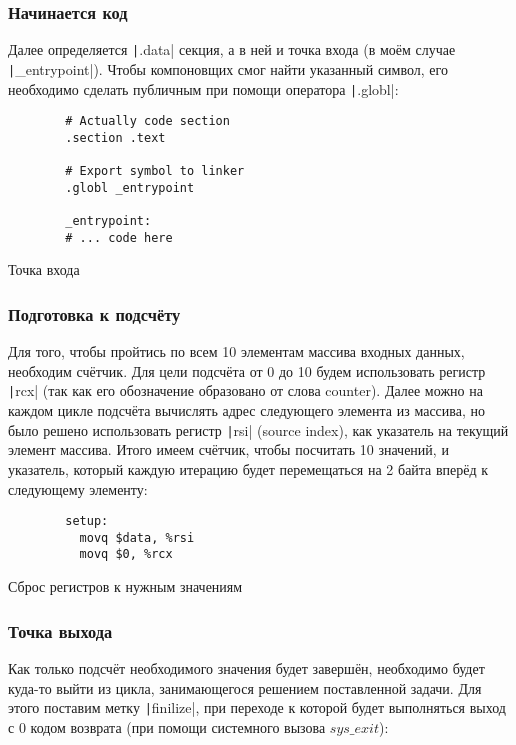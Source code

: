 \documentclass[a4paper]{article}
\begin{document}
  \subsubsection{Начинается код}

  Далее определяется \texttt|.data| секция, а в ней
  и точка входа (в моём случае \texttt|_entrypoint|).
  Чтобы компоновщих смог найти указанный символ, его необходимо
  сделать публичным при помощи оператора \texttt|.globl|:

  \begin{listing}[H]
    \begin{verbatim}
        # Actually code section
        .section .text

        # Export symbol to linker
        .globl _entrypoint

        _entrypoint:
        # ... code here
    \end{verbatim}
    \caption{Точка входа}
  \end{listing}

  \subsubsection{Подготовка к подсчёту}

  Для того, чтобы пройтись по всем 10 элементам массива входных данных,
  необходим счётчик. Для цели подсчёта от 0 до 10 будем использовать
  регистр \texttt|rcx| (так как его обозначение образовано
  от слова counter). Далее можно на каждом цикле подсчёта
  вычислять адрес следующего элемента из массива, но было решено 
  использовать регистр \texttt|rsi| (source index),
  как указатель на текущий элемент массива. Итого имеем счётчик,
  чтобы посчитать 10 значений, и указатель, который каждую итерацию будет
  перемещаться на 2 байта вперёд к следующему элементу:

  \begin{listing}[H]
    \begin{verbatim}
        setup:
          movq $data, %rsi  
          movq $0, %rcx
    \end{verbatim}
    \caption{Сброс регистров к нужным значениям}
  \end{listing}

  \subsubsection{Точка выхода}

  Как только подсчёт необходимого значения будет завершён,
  необходимо будет куда-то выйти из цикла, занимающегося
  решением поставленной задачи. Для этого поставим метку
  \texttt|finilize|, при переходе к которой будет
  выполняться выход с 0 кодом возврата (при помощи системного
  вызова $sys\_exit$):
\end{document}
